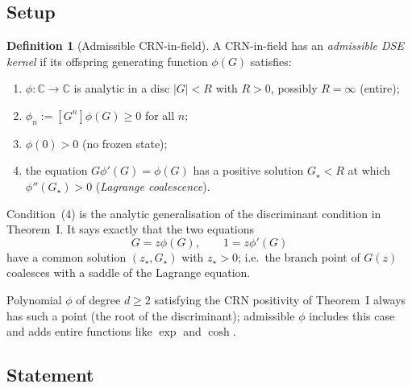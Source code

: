 \documentclass[11pt,a4paper]{article}
\newcommand{\C}{\mathbb{C}}
\theoremstyle{plain}
\theoremstyle{definition}
\newtheorem{definition}{Definition}
\begin{document}
\subsection{Setup}

\begin{definition}[Admissible CRN-in-field]
\label{def:admissible-crn}
A CRN-in-field has an \emph{admissible DSE kernel} if its offspring
generating function $\phi(G)$ satisfies:
\begin{enumerate}[label=(\arabic*), leftmargin=1.4em]
  \item $\phi: \C \to \C$ is analytic in a disc $|G| < R$ with $R > 0$,
    possibly $R = \infty$ (entire);
  \item $\phi_n := [G^n]\phi(G) \geq 0$ for all $n$;
  \item $\phi(0) > 0$ (no frozen state);
  \item the equation $G\phi'(G) = \phi(G)$ has a positive solution
    $G_\star < R$ at which $\phi''(G_\star) > 0$ (\emph{Lagrange
    coalescence}).
\end{enumerate}
\end{definition}

Condition~(4) is the analytic generalisation of the discriminant
condition in Theorem~I.  It says exactly that the two equations
\begin{equation}
  \label{eq:saddle-coalesce}
  G = z\phi(G), \qquad 1 = z\phi'(G)
\end{equation}
have a common solution $(z_\star, G_\star)$ with $z_\star > 0$; i.e.\
the branch point of $G(z)$ coalesces with a saddle of the Lagrange
equation.

Polynomial $\phi$ of degree $d \geq 2$ satisfying the CRN
positivity of Theorem~I always has such a point (the root of the
discriminant); admissible $\phi$ includes this case and adds entire
functions like $\exp$ and $\cosh$.

\subsection{Statement}
\end{document}
